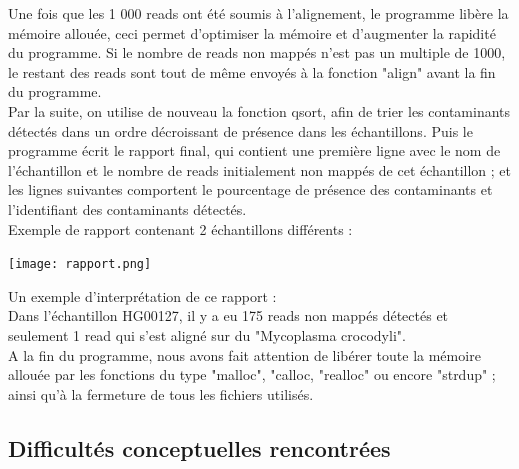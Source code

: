 \documentclass[a4paper,12pt]{article}
\begin{document}
Une fois que les 1 000 reads ont été soumis à l'alignement, le programme libère la mémoire allouée, ceci permet d'optimiser la mémoire et d'augmenter la rapidité du programme. Si le nombre de reads non mappés n'est pas un multiple de 1000, le restant des reads sont tout de même envoyés à la fonction "align" avant la fin du programme. \\


Par la suite, on utilise de nouveau la fonction qsort, afin de trier les contaminants détectés dans un ordre décroissant de présence dans les échantillons. Puis le programme écrit le rapport final, qui contient une première ligne avec le nom de l'échantillon et le nombre de reads initialement non mappés de cet échantillon ; et les lignes suivantes comportent le pourcentage de présence des contaminants et l'identifiant des contaminants détectés.\\

Exemple de rapport contenant 2 échantillons différents :  \begin{center}
 \texttt{[image: rapport.png]}~\\ \end{center}

Un exemple d'interprétation de ce rapport : \\
Dans l'échantillon HG00127, il y a eu 175 reads non mappés détectés et seulement 1 read qui s'est aligné sur du "Mycoplasma crocodyli". \\

A la fin du programme, nous avons fait attention de libérer toute la mémoire allouée par les fonctions du type "malloc", "calloc, "realloc" ou encore "strdup" ; ainsi qu'à la fermeture de tous les fichiers utilisés.

\subsection{Difficultés conceptuelles rencontrées}
\end{document}
